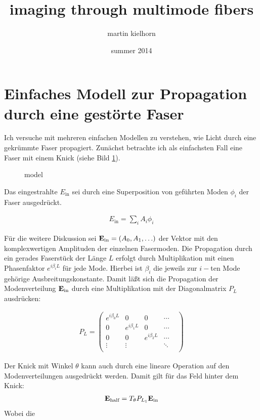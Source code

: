 \documentclass{article}
\author{martin kielhorn}
\title{imaging through multimode fibers}
\date{summer 2014}
\begin{document}
\maketitle

\section{Einfaches Modell zur Propagation durch eine gest\"orte Faser}
Ich versuche mit mehreren einfachen Modellen zu verstehen, wie Licht
durch eine gekr\"ummte Faser propagiert. Zun\"achst betrachte ich als
einfachsten Fall eine Faser mit einem Knick (siehe Bild
\ref{fig:model}).
\begin{figure}[htbp]
  \centering
  
  \caption{model}
  \label{fig:model}
\end{figure}

Das eingestrahlte $E_\textrm{in}$ sei durch eine Superposition von
gef\"uhrten Moden $\phi_i$ der Faser ausgedr\"uckt.

\begin{align}
  E_\textrm{in} = \sum_i A_i \phi_i
\end{align}

F\"ur die weitere Diskussion sei ${\bf
  E_\textrm{in}}=(A_0,A_1,\ldots)$ der Vektor mit den komplexwertigen
Amplituden der einzelnen Fasermoden. Die Propagation durch ein gerades
Faserst\"uck der L\"ange $L$ erfolgt durch Multiplikation mit einen
Phasenfaktor $e^{i\beta_i L}$ f\"ur jede Mode. Hierbei ist $\beta_i$
die jeweils zur $i-$ten Mode geh\"orige Ausbreitungskonstante. Damit
l\"a\ss t sich die Propagation der Modenverteilung ${\bf E_\textrm{in}}$ durch
eine Multiplikation mit der Diagonalmatrix $P_L$ ausdr\"ucken:

\begin{align}
  P_L =
 \begin{pmatrix}
  e^{i\beta_0 L } & 0 & 0 & \cdots  \\
  0 & e^{i\beta_1 L } & 0 & \cdots  \\
  0 & 0 & e^{i\beta_2 L } & \cdots  \\
  \vdots  & \vdots  &  & \ddots &   \\
 \end{pmatrix}
\end{align}

Der Knick mit Winkel $\theta$ kann auch durch eine lineare Operation
auf den Modenverteilungen ausgedr\"uckt werden. Damit gilt f\"ur das
Feld hinter dem Knick:
\begin{align}
  {\bf E_\textrm{half}} = T_\theta P_{L_1} {\bf E_\textrm{in}} 
\end{align}
Wobei die
\end{document}
